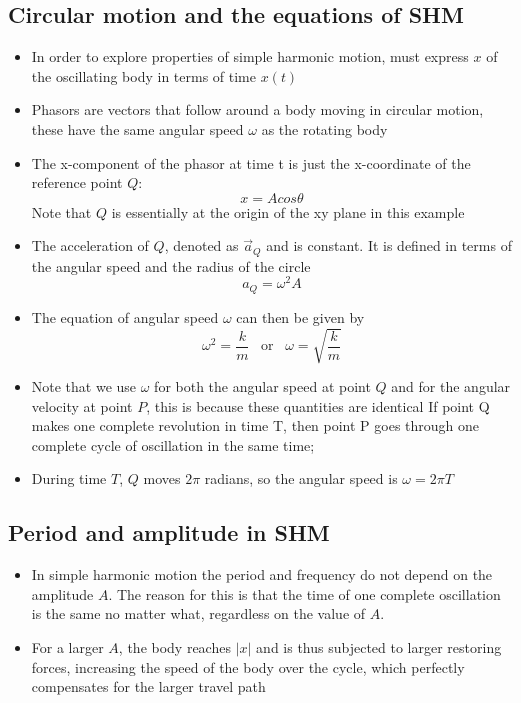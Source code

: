 \documentclass[11pt, a4paper]{article}
\begin{document}
\subsection{Circular motion and the equations of SHM}
\begin{itemize}
    \item In order to explore properties of simple harmonic motion, must express $x$ of the
        oscillating body in terms of time $x(t)$
    \item Phasors are vectors that follow around a body moving in circular motion, these have
        the same angular speed $\omega$ as the rotating body
    \item The x-component of the phasor at time t is just the x-coordinate of the reference
        point $Q$:
        \begin{equation}
            x = Acos\theta
        \end{equation}
        Note that $Q$ is essentially at the origin of the xy plane in this example
    \item The acceleration of $Q$, denoted as $\vec{a}_{Q}$ and is constant. It is
        defined in terms of the angular speed and the radius of the circle
        \begin{equation}
            a_{Q} = \omega{}^2A
        \end{equation}
    \item The equation of angular speed $\omega$ can then be given by
        \begin{equation}
            \omega^{2} = \frac{k}{m} \; \; \; \text{or} \; \; \;  \omega = \sqrt{\frac{k}{m}}
        \end{equation}
    \item Note that we use $\omega$ for both the angular speed at point $Q$ and for the
        angular velocity at point $P$, this is because these quantities are identical
        If point Q makes one complete revolution in time T, then point P goes through
        one complete cycle of oscillation in the same time;
    \item During time $T$, $Q$ moves $2\pi$ radians, so the angular speed is $\omega = 2\pi T$
\end{itemize}
\subsection{Period and amplitude in SHM}
\begin{itemize}
    \item In simple harmonic motion the period and frequency do not depend on the amplitude $A$. The
        reason for this is that the time of one complete oscillation is the same no matter what,
        regardless on the value of $A$.
    \item For a larger $A$, the body reaches $\vert x \vert$ and is thus subjected to larger restoring
        forces, increasing the speed of the body over the cycle, which perfectly compensates for the
        larger travel path
\end{itemize}
\end{document}

